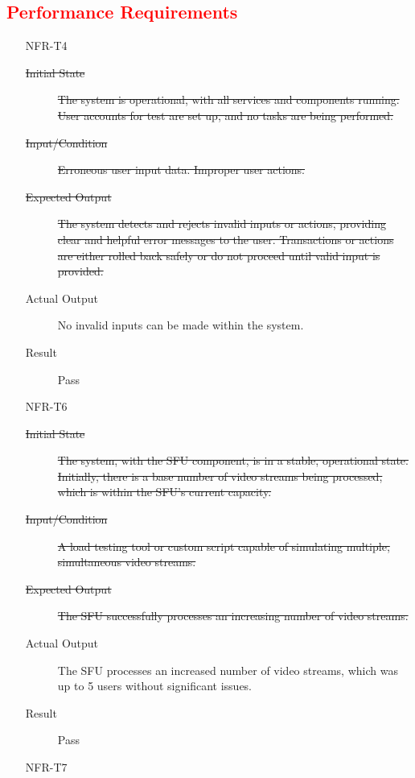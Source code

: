 \documentclass[12pt, titlepage]{article}
\newcommand{\rt}[1]{\textcolor{red}{#1}}
\begin{document}
  \rt{\subsection{Performance Requirements}}
  \begin{enumerate}
    \item[NFR-T4] \label{NFRT4}
      \begin{description}
      \item[\sout{Initial State}]\sout{ The system is operational, with all services and
        components running. User accounts for test are set up, and no tasks are
        being performed.
      }
      \item[\sout{Input/Condition}]\sout{ Erroneous user input data. Improper user actions.
      }
      \item[\sout{Expected Output}]\sout{ The system detects and rejects invalid inputs or
        actions, providing clear and helpful error messages to the user.
        Transactions or actions are either rolled back safely or do not proceed
        until valid input is provided.
      }
      \item[Actual Output] No invalid inputs can be made within the system.
      \item[Result] Pass
      \end{description}
    \item[NFR-T6] \label{NFRT6}
      \begin{description}
      \item[\sout{Initial State}]\sout{ The system, with the SFU component, is in a stable,
        operational state. Initially, there is a base number of video streams
        being processed, which is within the SFU's current capacity.
      }
      \item[\sout{Input/Condition}]\sout{ A load testing tool or custom script capable of
        simulating multiple, simultaneous video streams.
      }
      \item[\sout{Expected Output}]\sout{ The SFU successfully processes an increasing number of
        video streams.
      }
      \item[Actual Output] The SFU processes an increased number of video streams,
        which was up to 5 users without significant issues.
      \item[Result] Pass
      \end{description}
    \item[NFR-T7] \label{NFRT7}
      \begin{description}

\end{description}
\end{enumerate}
\end{document}
